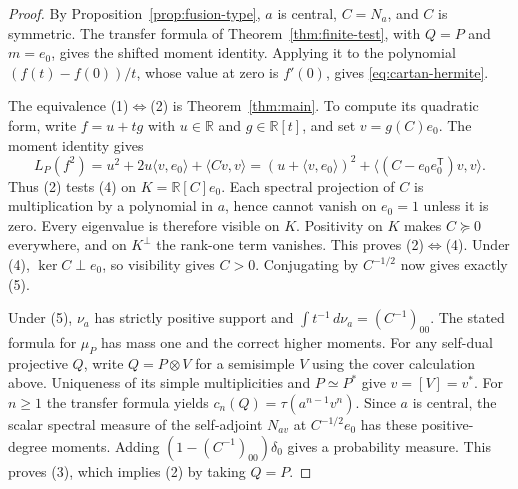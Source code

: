 \documentclass[11pt,reqno]{amsart}
\theoremstyle{definition}
\newcommand{\RR}{\mathbb R}
\begin{document}
\begin{proof}
By Proposition~\ref{prop:fusion-type}, $a$ is central, $C=N_a$, and $C$ is symmetric. The transfer formula of Theorem~\ref{thm:finite-test}, with $Q=P$ and $m=e_0$, gives the shifted moment identity. Applying it to the polynomial $(f(t)-f(0))/t$, whose value at zero is $f'(0)$, gives \eqref{eq:cartan-hermite}.

The equivalence (1)$\Leftrightarrow$(2) is Theorem~\ref{thm:main}.
To compute its quadratic form, write $f=u+tg$ with $u\in\RR$ and
$g\in\RR[t]$, and set $v=g(C)e_0$. The moment identity gives
\begin{equation}\label{eq:cartan-square}
 L_P(f^2)=u^2+2u\langle v,e_0\rangle+\langle Cv,v\rangle
 =(u+\langle v,e_0\rangle)^2+
        \langle(C-e_0e_0^{\mathsf T})v,v\rangle .
\end{equation}
Thus (2) tests (4) on $K=\RR[C]e_0$. Each spectral projection of $C$ is multiplication by a polynomial in $a$, hence cannot vanish on $e_0=1$ unless it is zero. Every eigenvalue is therefore visible on $K$. Positivity on $K$ makes $C\succeq0$ everywhere, and on $K^\perp$ the rank-one term vanishes. This proves (2)$\Leftrightarrow$(4). Under (4), $\ker C\perp e_0$, so visibility gives $C>0$. Conjugating by $C^{-1/2}$ now gives exactly (5).

Under (5), $\nu_a$ has strictly positive support and
$\int t^{-1}\,d\nu_a=(C^{-1})_{00}$. The stated formula for $\mu_P$
has mass one and the correct higher moments. For any self-dual projective
$Q$, write $Q=P\otimes V$ for a semisimple $V$ using the cover calculation
above. Uniqueness of its simple multiplicities and $P\simeq P^*$ give
$v=[V]=v^*$. For $n\ge1$ the transfer formula yields
$c_n(Q)=\tau(a^{n-1}v^n)$. Since $a$ is central, the scalar spectral
measure of the self-adjoint $N_{av}$ at $C^{-1/2}e_0$ has these
positive-degree moments. Adding $(1-(C^{-1})_{00})\delta_0$ gives
a probability measure. This proves (3), which implies (2) by taking $Q=P$.
\end{proof}
\end{document}
